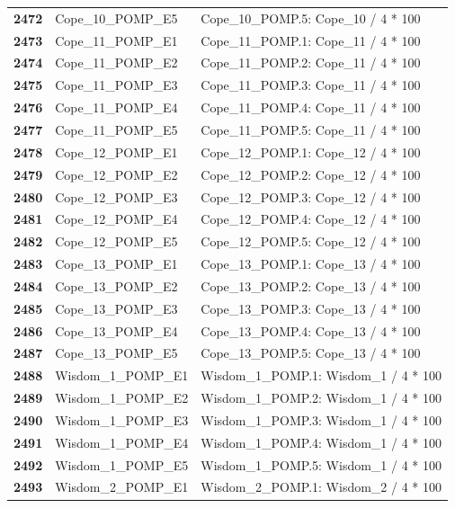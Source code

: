 \documentclass[
  letterpaper,
  DIV=11,
  numbers=noendperiod]{scrartcl}
\begin{document}
\begin{longtable}[t]{>{}cll}
\textbf{2472} & Cope\_10\_POMP\_E5 & Cope\_10\_POMP.5: Cope\_10 / 4 * 100\\
\textbf{2473} & Cope\_11\_POMP\_E1 & Cope\_11\_POMP.1: Cope\_11 / 4 * 100\\
\textbf{2474} & Cope\_11\_POMP\_E2 & Cope\_11\_POMP.2: Cope\_11 / 4 * 100\\
\textbf{2475} & Cope\_11\_POMP\_E3 & Cope\_11\_POMP.3: Cope\_11 / 4 * 100\\
\addlinespace
\textbf{2476} & Cope\_11\_POMP\_E4 & Cope\_11\_POMP.4: Cope\_11 / 4 * 100\\
\textbf{2477} & Cope\_11\_POMP\_E5 & Cope\_11\_POMP.5: Cope\_11 / 4 * 100\\
\textbf{2478} & Cope\_12\_POMP\_E1 & Cope\_12\_POMP.1: Cope\_12 / 4 * 100\\
\textbf{2479} & Cope\_12\_POMP\_E2 & Cope\_12\_POMP.2: Cope\_12 / 4 * 100\\
\textbf{2480} & Cope\_12\_POMP\_E3 & Cope\_12\_POMP.3: Cope\_12 / 4 * 100\\
\addlinespace
\textbf{2481} & Cope\_12\_POMP\_E4 & Cope\_12\_POMP.4: Cope\_12 / 4 * 100\\
\textbf{2482} & Cope\_12\_POMP\_E5 & Cope\_12\_POMP.5: Cope\_12 / 4 * 100\\
\textbf{2483} & Cope\_13\_POMP\_E1 & Cope\_13\_POMP.1: Cope\_13 / 4 * 100\\
\textbf{2484} & Cope\_13\_POMP\_E2 & Cope\_13\_POMP.2: Cope\_13 / 4 * 100\\
\textbf{2485} & Cope\_13\_POMP\_E3 & Cope\_13\_POMP.3: Cope\_13 / 4 * 100\\
\addlinespace
\textbf{2486} & Cope\_13\_POMP\_E4 & Cope\_13\_POMP.4: Cope\_13 / 4 * 100\\
\textbf{2487} & Cope\_13\_POMP\_E5 & Cope\_13\_POMP.5: Cope\_13 / 4 * 100\\
\textbf{2488} & Wisdom\_1\_POMP\_E1 & Wisdom\_1\_POMP.1: Wisdom\_1 / 4 * 100\\
\textbf{2489} & Wisdom\_1\_POMP\_E2 & Wisdom\_1\_POMP.2: Wisdom\_1 / 4 * 100\\
\textbf{2490} & Wisdom\_1\_POMP\_E3 & Wisdom\_1\_POMP.3: Wisdom\_1 / 4 * 100\\
\addlinespace
\textbf{2491} & Wisdom\_1\_POMP\_E4 & Wisdom\_1\_POMP.4: Wisdom\_1 / 4 * 100\\
\textbf{2492} & Wisdom\_1\_POMP\_E5 & Wisdom\_1\_POMP.5: Wisdom\_1 / 4 * 100\\
\textbf{2493} & Wisdom\_2\_POMP\_E1 & Wisdom\_2\_POMP.1: Wisdom\_2 / 4 * 100\\

\end{longtable}
\end{document}
